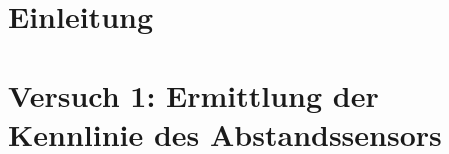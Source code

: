 \documentclass[12pt, oneside, a4paper, \docLanguage]{report}
\begin{document}

\setcounter{section}{0}



\clearpage

%
%


%
%


%
%


%
%




\setcounter{page}{1} 
\pagestyle{default}
%
%
\chapter{Einleitung}
\label{chap:EINL}

\cite{Franz2016n}
\cite{Franz2016e}

%
%
\chapter{Versuch 1: Ermittlung der Kennlinie des Abstandssensors}
\label{chap:VERSUCH_1}
\end{document}
